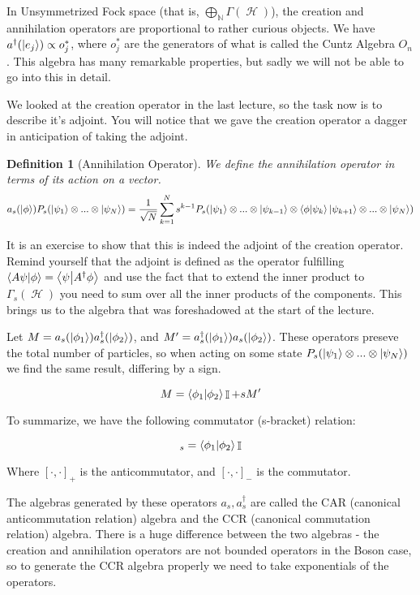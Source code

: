 \documentclass{article}
\DeclareMathOperator{\Hh}{{\mathcal{H}}}
\DeclareMathOperator{\NN}{\mathbb{N}}
\DeclareMathOperator{\II}{\mathbb{I}}
\newcommand{\create}[1]{a^\dagger_s(#1)}
\newcommand{\annih}[1]{a_s(#1)}
\newtheorem{defn}{Definition}
\begin{document}
In Unsymmetrized Fock space (that is, $\bigoplus_{\NN} \Gamma(\Hh)$), the creation and annihilation operators are proportional to rather curious objects. We have $a^\dagger(\ket{e_j}) \propto o^*_j$, where $o_j^*$ are the generators of what is called the Cuntz Algebra $O_n$. This algebra has many remarkable properties, but sadly we will not be able to go into this in detail.

We looked at the creation operator in the last lecture, so the task now is to describe it's adjoint. You will notice that we gave the creation operator a dagger in anticipation of taking the adjoint. 

\begin{defn}[Annihilation Operator] We define the annihilation operator in terms of its action on a vector.
\begin{equation}
a_s(\ket{\phi})P_s(\ket{\psi_1}\otimes...\otimes\ket{\psi_N})
= \frac{1}{\sqrt{N}}\sum_{k=1}^N s^{k-1} P_s(\ket{\psi_1}\otimes...\otimes\ket{\psi_{k-1}}\otimes\braket{\phi}{\psi_k}\ket{\psi_{k+1}}\otimes...\otimes\ket{\psi_N})
\end{equation}
\end{defn}

It is an exercise to show that this is indeed the adjoint of the creation operator. Remind yourself that the adjoint is defined as the operator fulfilling $\braket{A\psi}{\phi}=\braket{\psi}{A^\dagger \phi}$ and use the fact that to extend the inner product to $\Gamma_s(\Hh)$ you need to sum over all the inner products of the components. This brings us to the algebra that was foreshadowed at the start of the lecture.

Let $M = \annih{\ket{\phi_1}}\create{\ket{\phi_2}}$, and $M'=\create{\ket{\phi_1}}\annih{\ket{\phi_2}}$. These operators preseve the total number of particles, so when acting on some state $P_s(\ket{\psi_1}\otimes...\otimes\ket{\psi_N})$ we find the same result, differing by a sign.

\[M=\braket{\phi_1}{\phi_2}\II+sM'\]

To summarize, we have the following commutator (s-bracket) relation:

\begin{equation}
[\create{\ket{\phi_1}},\annih{\ket{\phi_2}}]_s=\braket{\phi_1}{\phi_2}\II
\end{equation}

Where $[\cdot,\cdot]_+$ is the anticommutator, and $[\cdot,\cdot]_-$ is the commutator.

The algebras generated by these operators $a_s,a^\dagger_s$ are called the CAR (canonical anticommutation relation) algebra and the CCR (canonical commutation relation) algebra. There is a huge difference between the two algebras - the creation and annihilation operators are not bounded operators in the Boson case, so to generate the CCR algebra properly we need to take exponentials of the operators. 
\end{document}

